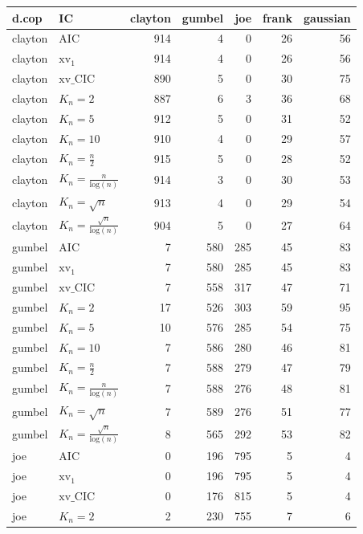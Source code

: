 \begin{table}[htbp]
\centering
\begin{tabular}{llrrrrr}
  \hline
d.cop & IC & clayton & gumbel & joe & frank & gaussian \\ 
  \hline
clayton & AIC & 914 & 4 & 0 & 26 & 56 \\ 
  clayton & $\text{xv}_{1}$ & 914 & 4 & 0 & 26 & 56 \\ 
  clayton & $\text{xv}\_\text{CIC}$ & 890 & 5 & 0 & 30 & 75 \\ 
  clayton & $K_{n}=2$ & 887 & 6 & 3 & 36 & 68 \\ 
  clayton & $K_{n}=5$ & 912 & 5 & 0 & 31 & 52 \\ 
  clayton & $K_{n}=10$ & 910 & 4 & 0 & 29 & 57 \\ 
  clayton & $K_{n}=\tfrac{n}{2}$ & 915 & 5 & 0 & 28 & 52 \\ 
  clayton & $K_{n}=\tfrac{n}{\text{log}(n)}$ & 914 & 3 & 0 & 30 & 53 \\ 
  clayton & $K_{n}=\sqrt{n}$ & 913 & 4 & 0 & 29 & 54 \\ 
  clayton & $K_{n}=\tfrac{\sqrt{n}}{\text{log}(n)}$ & 904 & 5 & 0 & 27 & 64 \\ 
   \hdashline
gumbel & AIC & 7 & 580 & 285 & 45 & 83 \\ 
  gumbel & $\text{xv}_{1}$ & 7 & 580 & 285 & 45 & 83 \\ 
  gumbel & $\text{xv}\_\text{CIC}$ & 7 & 558 & 317 & 47 & 71 \\ 
  gumbel & $K_{n}=2$ & 17 & 526 & 303 & 59 & 95 \\ 
  gumbel & $K_{n}=5$ & 10 & 576 & 285 & 54 & 75 \\ 
  gumbel & $K_{n}=10$ & 7 & 586 & 280 & 46 & 81 \\ 
  gumbel & $K_{n}=\tfrac{n}{2}$ & 7 & 588 & 279 & 47 & 79 \\ 
  gumbel & $K_{n}=\tfrac{n}{\text{log}(n)}$ & 7 & 588 & 276 & 48 & 81 \\ 
  gumbel & $K_{n}=\sqrt{n}$ & 7 & 589 & 276 & 51 & 77 \\ 
  gumbel & $K_{n}=\tfrac{\sqrt{n}}{\text{log}(n)}$ & 8 & 565 & 292 & 53 & 82 \\ 
   \hdashline
joe & AIC & 0 & 196 & 795 & 5 & 4 \\ 
  joe & $\text{xv}_{1}$ & 0 & 196 & 795 & 5 & 4 \\ 
  joe & $\text{xv}\_\text{CIC}$ & 0 & 176 & 815 & 5 & 4 \\ 
  joe & $K_{n}=2$ & 2 & 230 & 755 & 7 & 6 \\ 

\end{tabular}
\end{table}
